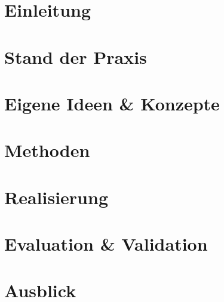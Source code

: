 \documentclass[	%
				a4paper, %
				onecolumn, %
				oneside, %
				titlepage, %
				openany, %
				12pt] %
				{report}
\begin{document}
\thispagestyle{empty}





\setcounter{page}{2}

\tableofcontents

\chapter{Einleitung}
	
\chapter{Stand der Praxis}
\chapter{Eigene Ideen \& Konzepte}
\chapter{Methoden}
\chapter{Realisierung}
\chapter{Evaluation \& Validation}
\chapter{Ausblick}


\cleardoublepage
{}
{}
\listoffigures

\cleardoublepage
{}
{}
\listoftables

\cleardoublepage
{}
{}
\lstlistoflistings

\cleardoublepage
{}
\markboth{\uppercase{\ListOfAbbreviations}}{}
\chapter*{\ListOfAbbreviations}


\cleardoublepage
{}
{}


\cleardoublepage
{}
{}
\printindex

\thispagestyle{empty}

\end{document}
